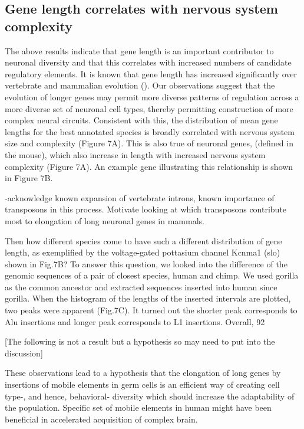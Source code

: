 \subsection{Gene length correlates with nervous system complexity}

The above results indicate that gene length is an important contributor to neuronal diversity and that this correlates with increased numbers of candidate regulatory elements. It is known that gene length has increased significantly over vertebrate and mammalian evolution (). Our observations suggest that the evolution of longer genes may permit more diverse patterns of regulation across a more diverse set of neuronal cell types, thereby permitting construction of more complex neural circuits. Consistent with this, the distribution of mean gene lengths for the best annotated species is broadly correlated with nervous system size and complexity (Figure 7A). This is also true of neuronal genes, (defined in the mouse), which also increase in length with increased nervous system complexity (Figure 7A). An example gene illustrating this relationship is shown in Figure 7B. 

-acknowledge known expansion of vertebrate introns, known importance of transposons in this process. Motivate looking at which transposons contribute most to elongation of long neuronal genes in mammals.

Then how different species come to have such a different distribution of gene length, as exemplified by the voltage-gated pottasium channel Kcnma1 (slo) shown in Fig.7B? To answer this question, we looked into the difference of the genomic sequences of a pair of closest species, human and chimp. We used gorilla as the common ancestor and extracted sequences inserted into human since gorilla. When the histogram of the lengths of the inserted intervals are plotted, two peaks were apparent (Fig.7C). It turned out the shorter peak corresponds to Alu insertions and longer peak corresponds to L1 insertions. Overall, 92%

[The following is not a result but a hypothesis so may need to put into the discussion]

These observations lead to a hypothesis that the elongation of long genes by insertions of mobile elements in germ cells is an efficient way of creating cell type-, and hence, behavioral- diversity which should increase the adaptability of the population. Specific set of mobile elements in human might have been beneficial in accelerated acquisition of complex brain.
